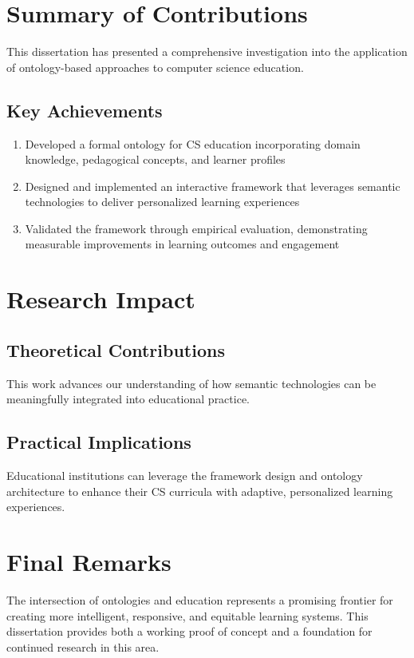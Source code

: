 \section{Summary of Contributions}

This dissertation has presented a comprehensive investigation into the application of ontology-based approaches to computer science education.

\subsection{Key Achievements}

\begin{enumerate}
    \item Developed a formal ontology for CS education incorporating domain knowledge, pedagogical concepts, and learner profiles
    \item Designed and implemented an interactive framework that leverages semantic technologies to deliver personalized learning experiences
    \item Validated the framework through empirical evaluation, demonstrating measurable improvements in learning outcomes and engagement
\end{enumerate}

\section{Research Impact}

\subsection{Theoretical Contributions}

This work advances our understanding of how semantic technologies can be meaningfully integrated into educational practice.

\subsection{Practical Implications}

Educational institutions can leverage the framework design and ontology architecture to enhance their CS curricula with adaptive, personalized learning experiences.

\section{Final Remarks}

The intersection of ontologies and education represents a promising frontier for creating more intelligent, responsive, and equitable learning systems. This dissertation provides both a working proof of concept and a foundation for continued research in this area.
